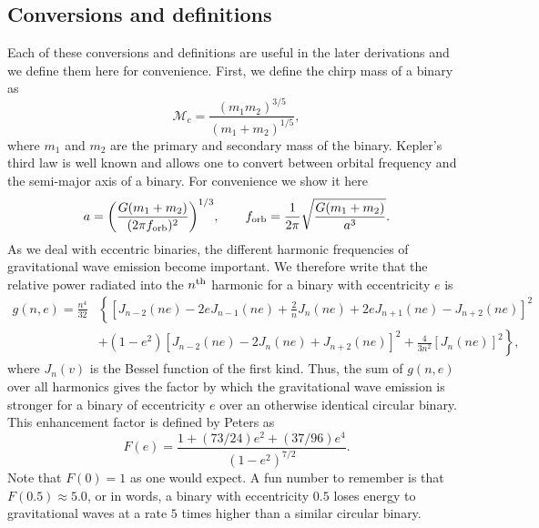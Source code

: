 \documentclass[twocolumn]{aastex63}
\begin{document}
\subsection{Conversions and definitions}
Each of these conversions and definitions are useful in the later derivations and we define them here for convenience. First, we define the chirp mass of a binary as 
\begin{equation}\label{eq:chirpmass}
    \mathcal{M}_c = \frac{(m_1 m_2)^{3/5}}{(m_1 + m_2)^{1/5}},
\end{equation}
where $m_1$ and $m_2$ are the primary and secondary mass of the binary. Kepler's third law is well known and allows one to convert between orbital frequency and the semi-major axis of a binary. For convenience we show it here
\begin{equation}\label{eq:kepler3rd}
    a = \qty(\frac{G(m_1 + m_2)}{(2 \pi f_{\rm orb})^{2}})^{1/3},\qquad f_{\rm orb} = \frac{1}{2 \pi} \sqrt{\frac{G(m_1 + m_2)}{a^3}}.
\end{equation}
As we deal with eccentric binaries, the different harmonic frequencies of gravitational wave emission become important. We therefore write that the relative power radiated into the $n^{\rm th}$ harmonic for a binary with eccentricity $e$ is \citep[][Eq.\,20]{Peters1963}
\begin{equation}\label{eq:g(n,e)}
    \begin{aligned}
        g(n, e) = \frac{n^{4}}{32} & \left\{ \left[ J_{n-2}(n e)-2 e J_{n-1}(n e)+\frac{2}{n} J_{n}(n e)+2 e J_{n+1}(n e)-J_{n+2}(n e)\right]^{2}\right.\\
        &\left.+\left(1-e^{2}\right)\left[J_{n-2}(n e)-2 J_{n}(n e)+J_{n+2}(n e)\right]^{2}+\frac{4}{3 n^{2}}\left[J_{n}(n e)\right]^{2}\right\},
    \end{aligned}
\end{equation}
where $J_{n}(v)$ is the Bessel function of the first kind. Thus, the sum of $g(n, e)$ over all harmonics gives the factor by which the gravitational wave emission is stronger for a binary of eccentricity $e$ over an otherwise identical circular binary. This enhancement factor is defined by Peters as \citep[][Eq.\,17]{Peters1963}
\begin{equation}\label{eq:eccentricity_enhancement_factor}
    F(e) = \frac{1 + (73 / 24) e^2 + (37 / 96) e^4}{(1 - e^2)^{7/2}}.
\end{equation}
Note that $F(0) = 1$ as one would expect. A fun number to remember is that $F(0.5) \approx 5.0$, or in words, a binary with eccentricity $0.5$ loses energy to gravitational waves at a rate $5$ times higher than a similar circular binary.
\end{document}
